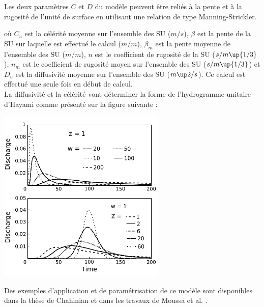 Les deux paramètres $C$ et $D$ du modèle peuvent être reliés à la pente et à la rugosité de l'unité de surface en utilisant une relation de type Manning-Strickler.



où $C_u$ est la célérité moyenne sur l'ensemble des SU ($m/s$), $\beta$ est la pente de la SU sur laquelle est effectué le calcul ($m/m$),  $\beta_m$ est la pente moyenne de l'ensemble des SU ($m/m$), $n$ est le coefficient de rugosité de la SU ($s/m\up{1/3}$), $n_m$ est le coefficient de rugosité moyen sur l'ensemble des SU ($s/m\up{1/3}$) et $D_u$ est la diffusivité moyenne sur l'ensemble des SU ($m\up2/s$). Ce calcul est effectué une seule fois en début de calcul.\\

La diffusivité et la célérité vont déterminer la forme de l'hydrogramme unitaire d'Hayami comme présenté sur la figure suivante :


\includegraphics[width=8cm]{common/Graphique_noyau_Hayami.pdf}

Des exemples d'application et de paramétrisation de ce modèle sont disponibles dans la thèse de Chahinian \cite{Chahinian2004} et dans les travaux de Moussa et al. \cite{Moussa2002}.\\
